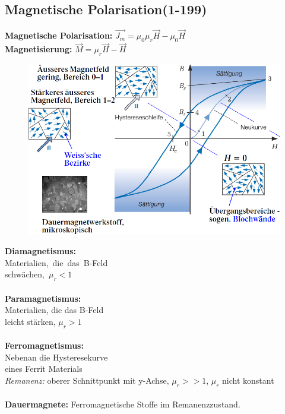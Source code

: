 \documentclass[a4paper, 6pt, landscape]{scrartcl}
\begin{document}
\begin{multicols*}{4}
				\subsection{Magnetische Polarisation(1-199)}
				\textbf{Magnetische Polarisation:} $\vec{J_m}=\mu_0\mu_r\vec{H}-\mu_0\vec{H}$\\
				\textbf{Magnetisierung:} $\vec{M}=\mu_r\vec{H}-\vec{H}$\\
				\vspace{-0.5cm}
				\begingroup				
				\begin{figure}
  				\begin{center}
   				\includegraphics[scale=0.16]{source/hyst.png}
  				\end{center}
				\end{figure}
				
				\mbox{\textbf{Diamagnetismus:}}\\
				\mbox{Materialien, die das B-Feld}\\
				\mbox{schwächen, $\mu_r<1$}\\ \\
				\textbf{Paramagnetismus:}\\
				Materialien, die das B-Feld\\
				leicht stärken,  $\mu_r>1$\\\\
				\mbox{\textbf{Ferromagnetismus:}} \\
				Nebenan die Hysteresekurve\\
				eines Ferrit Materials\\
				\textit{Remanenz:} oberer Schnittpunkt mit y-Achse, $\mu_r>>1$, $\mu_r$ nicht konstant\\\\
				\textbf{Dauermagnete:} Ferromagnetische Stoffe im Remanenzzustand.
				\endgroup

\end{multicols*}
\end{document}
